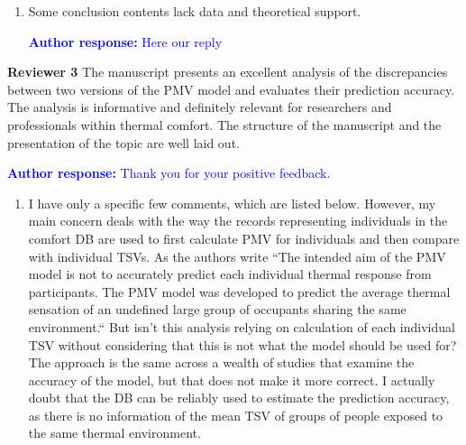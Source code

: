\documentclass[a4paper, 10pt]{letter}
\newcommand{\response}[1]{\textcolor{blue}{\textbf{Author response:} #1}}
\begin{document}
\begin{letter}
\begin{enumerate}
            \item Some conclusion contents lack data and theoretical support.

            \response{Here our reply}

        \end{enumerate}

        \clearpage

        \textbf{Reviewer 3}
        The manuscript presents an excellent analysis of the discrepancies between two versions of the PMV model and evaluates their prediction accuracy.
        The analysis is informative and definitely relevant for researchers and professionals within thermal comfort.
        The structure of the manuscript and the presentation of the topic are well laid out.

        \response{
            Thank you for your positive feedback.
        }

        \begin{enumerate}
            \item I have only a specific few comments, which are listed below.
            However, my main concern deals with the way the records representing individuals in the comfort DB are used to first calculate PMV for individuals and then compare with individual TSVs.
            As the authors write ``The intended aim of the PMV model is not to accurately predict each individual thermal response from participants.
            The PMV model was developed to predict the average thermal sensation of an undefined large group of occupants sharing the same environment.``
            But isn't this analysis relying on calculation of each individual TSV without considering that this is not what the model should be used for?
            The approach is the same across a wealth of studies that examine the accuracy of the model, but that does not make it more correct.
            I actually doubt that the DB can be reliably used to estimate the prediction accuracy, as there is no information of the mean TSV of groups of people exposed to the same thermal environment.


\end{enumerate}
\end{letter}
\end{document}

